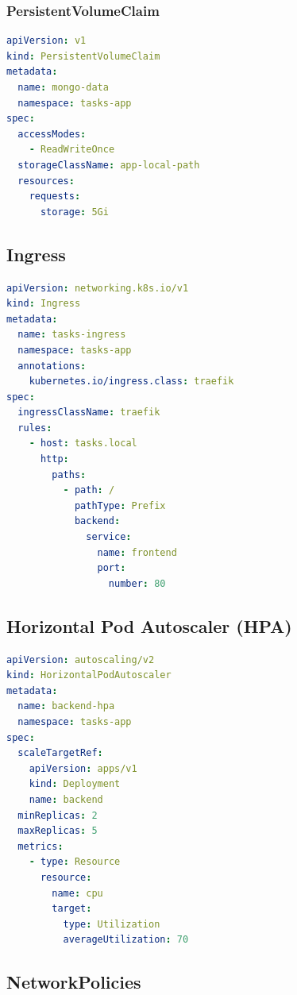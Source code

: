 \documentclass[12pt,a4paper]{report}
\begin{document}
\subsubsection{PersistentVolumeClaim}

\begin{lstlisting}[language=yaml,caption=mongo-pvc.yaml]
apiVersion: v1
kind: PersistentVolumeClaim
metadata:
  name: mongo-data
  namespace: tasks-app
spec:
  accessModes:
    - ReadWriteOnce
  storageClassName: app-local-path
  resources:
    requests:
      storage: 5Gi
\end{lstlisting}

\subsection{Ingress}

\begin{lstlisting}[language=yaml,caption=ingress.yaml]
apiVersion: networking.k8s.io/v1
kind: Ingress
metadata:
  name: tasks-ingress
  namespace: tasks-app
  annotations:
    kubernetes.io/ingress.class: traefik
spec:
  ingressClassName: traefik
  rules:
    - host: tasks.local
      http:
        paths:
          - path: /
            pathType: Prefix
            backend:
              service:
                name: frontend
                port:
                  number: 80
\end{lstlisting}

\subsection{Horizontal Pod Autoscaler (HPA)}

\begin{lstlisting}[language=yaml,caption=backend-hpa.yaml]
apiVersion: autoscaling/v2
kind: HorizontalPodAutoscaler
metadata:
  name: backend-hpa
  namespace: tasks-app
spec:
  scaleTargetRef:
    apiVersion: apps/v1
    kind: Deployment
    name: backend
  minReplicas: 2
  maxReplicas: 5
  metrics:
    - type: Resource
      resource:
        name: cpu
        target:
          type: Utilization
          averageUtilization: 70
\end{lstlisting}

\subsection{NetworkPolicies}
\end{document}
